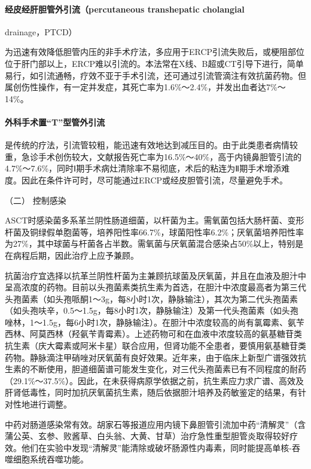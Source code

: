 \paragraph{经皮经肝胆管外引流（percutaneous transhepatic cholangial}
drainage，PTCD）

为迅速有效降低胆管内压的非手术疗法，多应用于ERCP引流失败后，或梗阻部位位于肝门部以上，ERCP难以引流的。本法常在X线、B超或CT引导下进行，简单易行，如引流通畅，疗效不亚于手术引流，还可通过引流管滴注有效抗菌药物。但属创伤性操作，有一定并发症，其死亡率为1.6\%～2.4\%，并发出血者达7\%～14\%。

\paragraph{外科手术置“T”型管外引流}

是传统的疗法，引流管较粗，能迅速有效地达到减压目的。由于此类患者病情较重，急诊手术创伤较大，文献报告死亡率为16.5\%～40\%，高于内镜鼻胆管引流的4.7\%～7.6\%，同时Ⅰ期手术病灶清除率不易彻底，术后的粘连为Ⅱ期手术增添难度。因此在条件许可时，尽可能通过ERCP或经皮胆管引流，尽量避免手术。

\hypertarget{text00322.htmlux5cux23CHP11-4-3-2-2}{}
（二） 控制感染

ASCT时感染菌多系革兰阴性肠道细菌，以杆菌为主。需氧菌包括大肠杆菌、变形杆菌及铜绿假单胞菌等，培养阳性率66.7\%，球菌阳性率6.2\%；厌氧菌培养阳性率为27\%，其中球菌与杆菌各占半数。需氧菌与厌氧菌混合感染占50\%以上，特别是在病程后期，因此治疗上应予兼顾。

抗菌治疗宜选择以抗革兰阴性杆菌为主兼顾抗球菌及厌氧菌，并且在血液及胆汁中呈高浓度的药物。目前以头孢菌素类抗生素为首选，在胆汁中浓度最高者为第三代头孢菌素（如头孢哌酮1～3g，每8小时1次，静脉输注），其次为第二代头孢菌素（如头孢呋辛，0.5～1.5g，每8小时1次，静脉输注）及第一代头孢菌素（如头孢唑林，1～1.5g，每6小时1次，静脉输注）。在胆汁中浓度较高的尚有氯霉素、氨苄西林、阿莫西林（羟氨苄青霉素）。上述药物可和在血液中浓度较高的氨基糖苷类抗生素（庆大霉素或阿米卡星）联合应用，但肾功能不全患者，要慎用氨基糖苷类药物。静脉滴注甲硝唑对厌氧菌有良好效果。近年来，由于临床上新型广谱强效抗生素的不断使用，胆道细菌谱可能发生变化，对三代头孢菌素已有不同程度的耐药（29.1\%～37.5\%）。因此，在未获得病原学依据之前，抗生素应力求广谱、高效及肝肾低毒性，同时加抗厌氧菌抗生素，随后依据胆汁培养及药敏鉴定的结果，有针对性地进行调整。

中药对肠道感染常有效。胡家石等报道应用内镜下鼻胆管引流加中药“清解灵”（含蒲公英、玄参、败酱草、白头翁、大黄、甘草）治疗急性重型胆管炎取得较好疗效。他们在实验中发现“清解灵”能清除或破坏肠源性内毒素，同时能提高单核-吞噬细胞系统吞噬功能。

